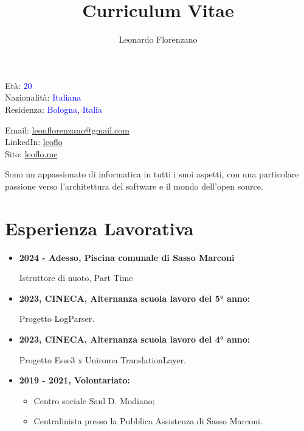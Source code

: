 \documentclass{paper}
\title{Curriculum Vitae}
\author{Leonardo Florenzano}
\begin{document}
\maketitle

\begin{multicols}{2}

\noindent
Età: \textcolor{blue}{20}\\
Nazionalità: \textcolor{blue}{Italiana}\\
Residenza: \textcolor{blue}{Bologna, Italia}

\columnbreak

\noindent
Email: \href{mailto:leonflorenzano@gmail.com}{leonflorenzano@gmail.com}\\
LinkedIn: \href{https://www.linkedin.com/in/leoflo}{leoflo}\\
Sito: \href{https://leoflo.me}{leoflo.me}

\end{multicols}

\noindent
Sono un appassionato di informatica in tutti i suoi aspetti, con una particolare passione verso l'architettura del software e il mondo dell'open source.

\section{Esperienza Lavorativa}

\begin{itemize}
    \item \textbf{2024 - Adesso, Piscina comunale di Sasso Marconi}
    
    Istruttore di nuoto, Part Time

    \item \textbf{2023, CINECA, Alternanza scuola lavoro del 5° anno:}
    
    Progetto LogParser.

    \item \textbf{2023, CINECA, Alternanza scuola lavoro del 4° anno:}
    
    Progetto Esse3 x Uniroma TranslationLayer.

    \item \textbf{2019 - 2021, Volontariato:}
    
    \begin{itemize}
        \item Centro sociale Saul D. Modiano;
        \item Centralinista presso la Pubblica Assistenza di Sasso Marconi.
    \end{itemize}
\end{itemize}
\end{document}
